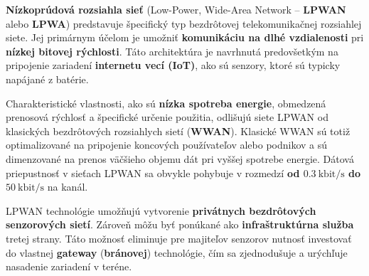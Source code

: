 \documentclass[11pt]{article}
\begin{document}
\noindent
\textbf{Nízkoprúdová rozsiahla sieť} (Low-Power, Wide-Area Network – \textbf{LPWAN} alebo \textbf{LPWA}) predstavuje špecifický typ bezdrôtovej telekomunikačnej rozsiahlej siete. Jej primárnym účelom je umožniť \textbf{komunikáciu na dlhé vzdialenosti} pri \textbf{nízkej bitovej rýchlosti}. Táto architektúra je navrhnutá predovšetkým na pripojenie zariadení \textbf{internetu vecí (IoT)}, ako sú senzory, ktoré sú typicky napájané z batérie.

\vspace{0.5\baselineskip} %

\noindent
Charakteristické vlastnosti, ako sú \textbf{nízka spotreba energie}, obmedzená prenosová rýchlosť a špecifické určenie použitia, odlišujú siete LPWAN od klasických bezdrôtových rozsiahlych sietí (\textbf{WWAN}). Klasické WWAN sú totiž optimalizované na pripojenie koncových používateľov alebo podnikov a sú dimenzované na prenos väčšieho objemu dát pri vyššej spotrebe energie. Dátová priepustnosť v sieťach LPWAN sa obvykle pohybuje v rozmedzí \textbf{od $0.3\ \text{kbit/s}$ do $50\ \text{kbit/s}$} na kanál.

\vspace{0.5\baselineskip}

\noindent
LPWAN technológie umožňujú vytvorenie \textbf{privátnych bezdrôtových senzorových sietí}. Zároveň môžu byť ponúkané ako \textbf{infraštruktúrna služba} tretej strany. Táto možnosť eliminuje pre majiteľov senzorov nutnosť investovať do vlastnej \textbf{gateway} (\textbf{bránovej}) technológie, čím sa zjednodušuje a urýchľuje nasadenie zariadení v teréne.
\end{document}
